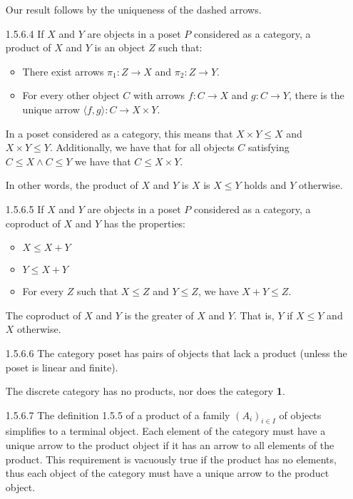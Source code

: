 \documentclass{article}
\begin{document}
\begin{enumerate}
  Our result follows by the uniqueness of the dashed arrows.

\item[]
\item [1.5.6.4]
  If $X$ and $Y$ are objects in a poset $P$ considered as a category, a product of $X$ and $Y$ is an object $Z$ such that:
  \begin{itemize}
  \item There exist arrows $\pi_1 : Z \rightarrow X$ and $\pi_2 : Z \rightarrow Y$.
  \item For every other object $C$ with arrows $f : C \rightarrow X$ and $g : C \rightarrow Y$, there is the unique arrow $\langle f , g \rangle : C \rightarrow X \times Y$.
  \end{itemize}
  In a poset considered as a category, this means that $X \times Y \le X$ and $X \times Y \le Y$.
  Additionally, we have that for all objects $C$ satisfying $C \le X \wedge C \le Y$ we have that $C \le X \times Y$.

  In other words, the product of $X$ and $Y$ is $X$ is $X \le Y$ holds and $Y$ otherwise.

\item[]
\item [1.5.6.5]
  If $X$ and $Y$ are objects in a poset $P$ considered as a category, a coproduct of $X$ and $Y$ has the properties:
  \begin{itemize}
  \item $X \le X + Y$
  \item $Y \le X + Y$
  \item For every $Z$ such that $X \le Z$ and $Y \le Z$, we have $X + Y \le Z$.
  \end{itemize}

  The coproduct of $X$ and $Y$ is the greater of $X$ and $Y$.
  That is, $Y$ if $X \le Y$ and $X$ otherwise.

\item[]
\item [1.5.6.6]
  The category poset has pairs of objects that lack a product (unless the poset is linear and finite).

  The discrete category has no products, nor does the category \textbf{1}.

\item[]
\item [1.5.6.7]
  The definition 1.5.5 of a product of a family $(A_i)_{i\in I}$ of objects simplifies to a terminal object.
  Each element of the category must have a unique arrow to the product object if it has an arrow to all elements of the product.
  This requirement is vacuously true if the product has no elements, thus each object of the category must have a unique arrow to the product object.
  
\end{enumerate}
\end{document}
